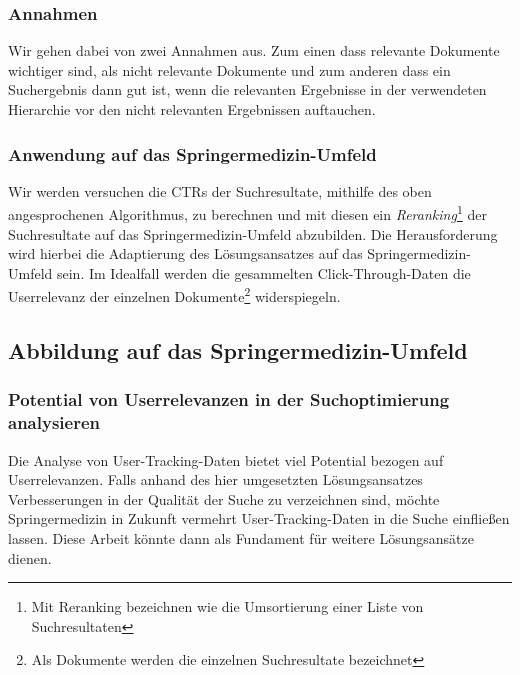 \subsubsection{Annahmen}
\label{sec:Einfuehrung:ZielArbeit:Suchoptimierung:Annahmen}

Wir gehen dabei von zwei Annahmen aus. Zum einen dass relevante Dokumente wichtiger sind, als nicht relevante Dokumente und zum anderen dass ein Suchergebnis dann gut ist, wenn die relevanten Ergebnisse in der verwendeten Hierarchie vor den nicht relevanten Ergebnissen auftauchen. 

\subsubsection{Anwendung auf das Springermedizin-Umfeld}
\label{sec:Einfuehrung:ZielArbeit:Suchoptimierung:AnwendungSpringermedizin-Umfeld}

Wir werden versuchen die CTRs der Suchresultate, mithilfe des oben angesprochenen Algorithmus, zu berechnen und mit diesen ein \textit{Reranking}\footnote{Mit Reranking bezeichnen wie die Umsortierung einer Liste von Suchresultaten} der Suchresultate auf das Springermedizin-Umfeld abzubilden. Die Herausforderung wird hierbei die Adaptierung des Lösungsansatzes auf das Springermedizin-Umfeld sein. Im Idealfall werden die gesammelten Click-Through-Daten die Userrelevanz der einzelnen Dokumente\footnote{Als Dokumente werden die einzelnen Suchresultate bezeichnet} widerspiegeln.

\subsection{Abbildung auf das Springermedizin-Umfeld}
\label{sec:Einfuehrung:ZielArbeit:AbbildungSpringermedizinUmfeld}

\subsubsection{Potential von Userrelevanzen in der Suchoptimierung analysieren}
\label{sec:Einfuehrung:ZielArbeit:Potential}

Die Analyse von User-Tracking-Daten bietet viel Potential bezogen auf Userrelevanzen. Falls anhand des hier umgesetzten Lösungsansatzes Verbesserungen in der Qualität der Suche zu verzeichnen sind, möchte Springermedizin in Zukunft vermehrt User-Tracking-Daten in die Suche einfließen lassen. Diese Arbeit könnte dann als Fundament für weitere Lösungsansätze dienen.

